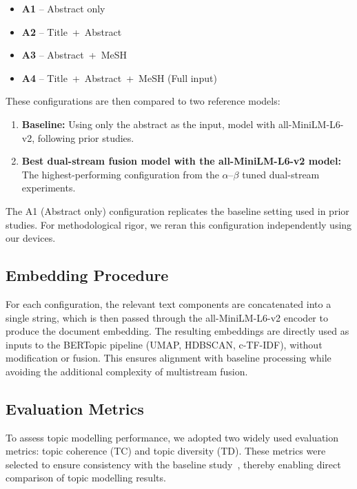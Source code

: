 \documentclass[authorproof,JACIII,researchpaper]{fujipressarticle}
\begin{document}
\begin{itemize}[leftmargin=*]
    \item \textbf{A1} -- Abstract only
    \item \textbf{A2} -- Title~+~Abstract
    \item \textbf{A3} -- Abstract~+~MeSH
    \item \textbf{A4} -- Title~+~Abstract~+~MeSH (Full input)
\end{itemize}

These configurations are then compared to two reference models:
\begin{enumerate}[leftmargin=*,label=\arabic*)]
    \item \textbf{Baseline:} Using only the abstract as the input, model with all-MiniLM-L6-v2, following prior studies.
    \item \textbf{Best dual-stream fusion model with the all-MiniLM-L6-v2 model:} The highest-performing configuration from the $\alpha$--$\beta$ tuned dual-stream experiments.
\end{enumerate}

The A1 (Abstract only) configuration replicates the baseline setting used in prior studies. For methodological rigor, we reran this configuration independently using our devices.

\subsection{Embedding Procedure}

For each configuration, the relevant text components are concatenated into a single string, which is then passed through the all-MiniLM-L6-v2 encoder to produce the document embedding. The resulting embeddings are directly used as inputs to the BERTopic pipeline (UMAP, HDBSCAN, c-TF-IDF), without modification or fusion. This ensures alignment with baseline processing while avoiding the additional complexity of multistream fusion.

\subsection{Evaluation Metrics}

To assess topic modelling performance, we adopted two widely used evaluation metrics: topic coherence (TC) and topic diversity (TD). These metrics were selected to ensure consistency with the baseline study~\cite{lezhnina_depression_2023}, thereby enabling direct comparison of topic modelling results.
\end{document}
